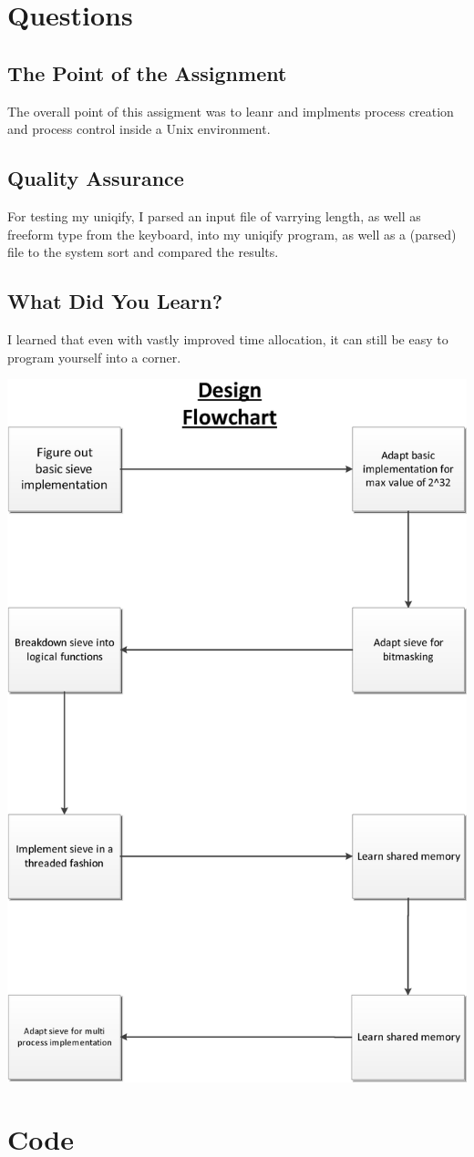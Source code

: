 \documentclass[letterpaper,10pt,titlepage]{article}
\begin{document}
\section{Questions}
\label{Project Quesions}
\subsection{The Point of the Assignment}
\label{Point}
The overall point of this assigment was to leanr and implments process creation and process control inside a Unix environment.
\subsection{Quality Assurance}
\label{QA}
For testing my uniqify, I parsed an input file of varrying length, as well as freeform type from the keyboard, into my uniqify program, as well as a (parsed) file to the system sort and compared the results.
\subsection{What Did You Learn?}
\label{Learned}
I learned that even with vastly improved time allocation, it can still be easy to program yourself into a corner.

\includegraphics[height=\textheight]{DesignFlowchart.eps}


\section{Code}
\label{myar Source Code}

\end{document}
